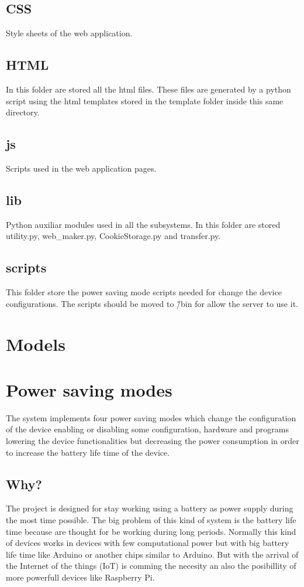 	\subsection{CSS}
	Style sheets of the web application.
	\subsection{HTML}
	In this folder are stored all the html files. These files are generated by a python script using the html templates stored in the template folder inside this same directory.
	\subsection{js}
	Scripts used in the web application pages.
	\subsection{lib}
	Python auxiliar modules used in all the subsystems. In this folder are stored utility.py, web\_maker.py, CookieStorage.py and transfer.py.
	\subsection{scripts} %
	This folder store the power saving mode scripts needed for change the device configurations. The scripts should be moved to \~/bin for allow the server to use it.
	\section{Models}
	\section{Power saving modes}
	The system implements four power saving modes which change the configuration of the device enabling or disabling some configuration, hardware and programs lowering the device functionalities but decreasing the power consumption in order to increase the battery life time of the device.
		\subsection{Why?}
		The project is designed for stay working using a battery as power supply during the most time possible. The big problem of this kind of system is the battery life time because are thought for be working during long periods. Normally this kind of devices works in devices with few computational power but with big battery life time like Arduino or another chips similar to Arduino. But with the arrival of the Internet of the things (IoT) is comming the necesity an also the posibillity of more powerfull devices like Raspberry Pi. 

